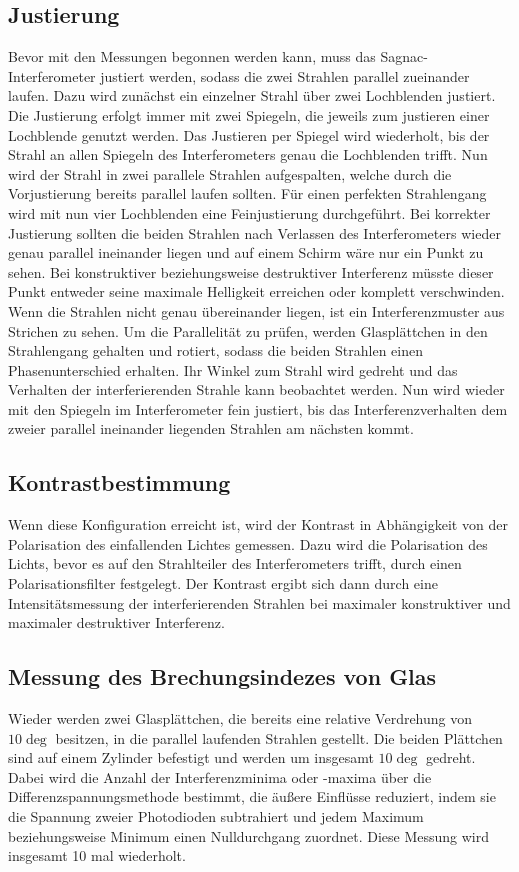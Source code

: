     \subsection{Justierung}
        Bevor mit den Messungen begonnen werden kann, muss das Sagnac-Interferometer justiert werden, sodass die zwei Strahlen parallel zueinander laufen. Dazu wird zunächst ein einzelner Strahl über zwei 
        Lochblenden justiert. Die Justierung erfolgt immer mit zwei Spiegeln, die jeweils zum justieren einer Lochblende genutzt werden. Das Justieren per Spiegel wird wiederholt, bis der Strahl an allen 
        Spiegeln des Interferometers genau die Lochblenden trifft. Nun wird der Strahl in zwei parallele Strahlen aufgespalten, welche durch die Vorjustierung bereits parallel laufen sollten. Für einen 
        perfekten Strahlengang wird mit nun vier Lochblenden eine Feinjustierung durchgeführt. \newline
        Bei korrekter Justierung sollten die beiden Strahlen nach Verlassen des Interferometers wieder genau parallel ineinander liegen und auf einem Schirm wäre nur ein Punkt zu sehen. Bei konstruktiver
        beziehungsweise destruktiver Interferenz müsste dieser Punkt entweder seine maximale Helligkeit erreichen oder komplett verschwinden. Wenn die Strahlen nicht genau übereinander liegen, ist ein 
        Interferenzmuster aus Strichen zu sehen. Um die Parallelität zu prüfen, werden Glasplättchen in den Strahlengang gehalten und rotiert, sodass die beiden Strahlen einen Phasenunterschied erhalten.
        Ihr Winkel zum Strahl wird gedreht und das Verhalten der interferierenden Strahle kann beobachtet werden. Nun wird wieder mit den Spiegeln im Interferometer fein justiert, bis das Interferenzverhalten
        dem zweier parallel ineinander liegenden Strahlen am nächsten kommt.

    \subsection{Kontrastbestimmung}
        Wenn diese Konfiguration erreicht ist, wird der Kontrast in Abhängigkeit von der Polarisation des einfallenden Lichtes gemessen. Dazu wird die Polarisation des Lichts, bevor es auf den Strahlteiler des
        Interferometers trifft, durch einen Polarisationsfilter festgelegt. Der Kontrast ergibt sich dann durch eine Intensitätsmessung der interferierenden Strahlen bei maximaler konstruktiver und maximaler
        destruktiver Interferenz. 

    \subsection{Messung des Brechungsindezes von Glas}
        Wieder werden zwei Glasplättchen, die bereits eine relative Verdrehung von $10\deg$ besitzen, in die parallel laufenden Strahlen gestellt. Die beiden Plättchen sind auf einem Zylinder befestigt und 
        werden um insgesamt $10\deg$ gedreht. Dabei wird die Anzahl der Interferenzminima  oder -maxima über die Differenzspannungsmethode bestimmt, die äußere Einflüsse reduziert, indem sie die Spannung 
        zweier Photodioden subtrahiert und jedem Maximum beziehungsweise Minimum einen Nulldurchgang zuordnet. Diese Messung wird insgesamt 10 mal wiederholt.

